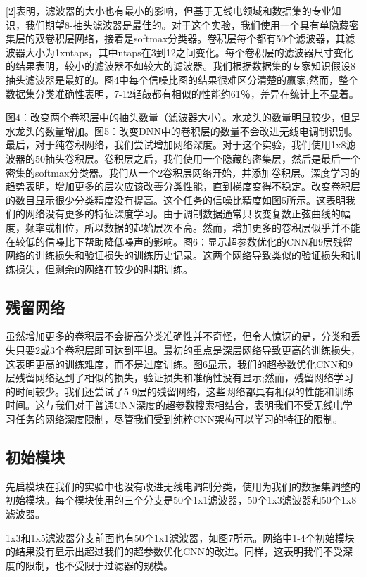 [2]表明，滤波器的大小也有最小的影响，但基于无线电领域和数据集的专业知识，我们期望8-抽头滤波器是最佳的。对于这个实验，我们使用一个具有单隐藏密集层的双卷积层网络，接着是softmax分类器。卷积层每个都有50个滤波器，其滤波器大小为1xntaps，其中ntaps在3到12之间变化。每个卷积层的滤波器尺寸变化的结果表明，较小的滤波器不如较大的滤波器。我们根据数据集的专家知识假设8抽头滤波器是最好的。图4中每个信噪比图的结果很难区分清楚的赢家;然而，整个数据集分类准确性表明，7-12轻敲都有相似的性能约61％，差异在统计上不显着。\par

图4：改变两个卷积层中的抽头数量（滤波器大小）。水龙头的数量明显较少，但是水龙头的数量增加。图5：改变DNN中的卷积层的数量不会改进无线电调制识别。最后，对于纯卷积网络，我们尝试增加网络深度。对于这个实验，我们使用1x8滤波器的50抽头卷积层。卷积层之后，我们使用一个隐藏的密集层，然后是最后一个密集的softmax分类器。我们从一个2卷积层网络开始，并添加卷积层。深度学习的趋势表明，增加更多的层次应该改善分类性能，直到梯度变得不稳定。改变卷积层的数目显示很少分类精度没有提高。这个任务的信噪比精度如图5所示。这表明我们的网络没有更多的特征深度学习。由于调制数据通常只改变复数正弦曲线的幅度，频率或相位，所以数据的起始层次不高。然而，增加更多的卷积层似乎并不能在较低的信噪比下帮助降低噪声的影响。图6：显示超参数优化的CNN和9层残留网络的训练损失和验证损失的训练历史记录。这两个网络导致类似的验证损失和训练损失，但剩余的网络在较少的时期训练。\par

\subsection{残留网络}

虽然增加更多的卷积层不会提高分类准确性并不奇怪，但令人惊讶的是，分类和丢失只要2或3个卷积层即可达到平坦。最初的重点是深层网络导致更高的训练损失，这表明更高的训练难度，而不是过度训练。图6显示，我们的超参数优化CNN和9层残留网络达到了相似的损失，验证损失和准确性没有显示;然而，残留网络学习的时间较少。我们还尝试了5-9层的残留网络，这些网络都具有相似的性能和训练时间。这与我们对于普通CNN深度的超参数搜索相结合，表明我们不受无线电学习任务的网络深度限制，尽管我们受到纯粹CNN架构可以学习的特征的限制。\par

\subsection{初始模块}

先启模块在我们的实验中也没有改进无线电调制分类，使用为我们的数据集调整的初始模块。每个模块使用的三个分支是50个1x1滤波器，50个1x3滤波器和50个1x8滤波器。\par
1x3和1x5滤波器分支前面也有50个1x1滤波器，如图7所示。网络中1-4个初始模块的结果没有显示出超过我们的超参数优化CNN的改进。同样，这表明我们不受深度的限制，也不受限于过滤器的规模。\par

